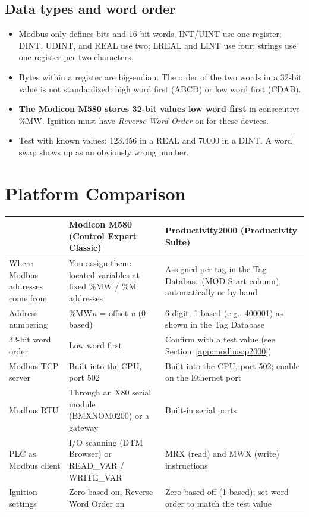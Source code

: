 \subsection*{Data types and word order}
\begin{itemize}[itemsep=2pt]
  \item Modbus only defines bits and 16-bit words. INT/UINT use one register; DINT, UDINT, and REAL use two; LREAL and LINT use four; strings use one register per two characters.
  \item Bytes within a register are big-endian. The order of the two words in a 32-bit value is not standardized: high word first (ABCD) or low word first (CDAB).
  \item \textbf{The Modicon M580 stores 32-bit values low word first} in consecutive \%MW. Ignition must have \emph{Reverse Word Order} on for these devices.
  \item Test with known values: 123.456 in a REAL and 70000 in a DINT. A word swap shows up as an obviously wrong number.
\end{itemize}

\section{Platform Comparison}
\begin{longtable}{@{}P{3.61cm}P{6.01cm}P{6.01cm}@{}}
\toprule
& \textbf{Modicon M580 (Control Expert Classic)} & \textbf{Productivity2000 (Productivity Suite)} \\
\midrule
\endhead
Where Modbus addresses come from & You assign them: located variables at fixed \%MW / \%M addresses & Assigned per tag in the Tag Database (MOD Start column), automatically or by hand \\
Address numbering & \%MW\textit{n} = offset \textit{n} (0-based) & 6-digit, 1-based (e.g., 400001) as shown in the Tag Database \\
32-bit word order & Low word first & Confirm with a test value (see Section~\ref{app:modbus:p2000}) \\
Modbus TCP server & Built into the CPU, port 502 & Built into the CPU, port 502; enable on the Ethernet port \\
Modbus RTU & Through an X80 serial module (BMXNOM0200) or a gateway & Built-in serial ports \\
PLC as Modbus client & I/O scanning (DTM Browser) or READ\_VAR / WRITE\_VAR & MRX (read) and MWX (write) instructions \\
Ignition settings & Zero-based on, Reverse Word Order on & Zero-based off (1-based); set word order to match the test value \\
\bottomrule
\end{longtable}

